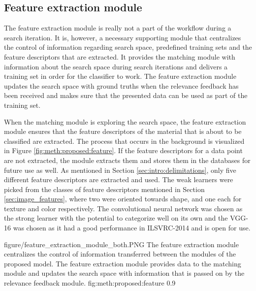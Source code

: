 \subsection{Feature extraction module}
\label{sec:method:proposed:features}
The feature extraction module is really not a part of the workflow during a search iteration. It is, however, a necessary supporting module that centralizes the control of information regarding search space, predefined training sets and the feature descriptors that are extracted. It provides the matching module with information about the search space during search iterations and delivers a training set in order for the classifier to work. The feature extraction module updates the search space with ground truths when the relevance feedback has been received and makes sure that the presented data can be used as part of the training set.

When the matching module is exploring the search space, the feature extraction module ensures that the feature descriptors of the material that is about to be classified are extracted. The process that occurs in the background is visualized in Figure \ref{fig:meth:proposed:feature}. If the feature descriptors for a data point are not extracted, the module extracts them and stores them in the databases for future use as well. As mentioned in Section \ref{sec:intro:delimitations}, only five different feature descriptors are extracted and used. The weak learners were picked from the classes of feature descriptors mentioned in Section \ref{sec:image_features}, where two were oriented towards shape, and one each for texture and color respectively. The convolutional neural network was chosen as the strong learner with the potential to categorize well on its own and the VGG-16 was chosen as it had a good performance in ILSVRC-2014 and is open for use. 


\singlefigure
{figure/feature_extraction_module_both.PNG}
{The feature extraction module centralizes the control of information transferred between the modules of the proposed model. The feature extraction module provides data to the matching module and updates the search space with information that is passed on by the relevance feedback module.}
{fig:meth:proposed:feature}
{0.9}





